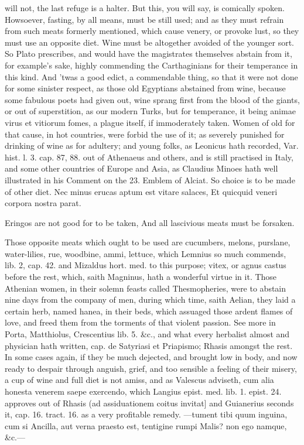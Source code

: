 {will not, the last refuge is a halter. But this, you will say, is
comically spoken. Howsoever, fasting, by all means, must be still used;
and as they must refrain from such meats formerly mentioned, which
cause venery, or provoke lust, so they must use an opposite diet.
Wine must be altogether avoided of the younger sort. So
Plato prescribes, and would have the magistrates themselves
abstain from it, for example's sake, highly commending the
Carthaginians for their temperance in this kind. And 'twas a good
edict, a commendable thing, so that it were not done for some sinister
respect, as those old Egyptians abstained from wine, because some
fabulous poets had given out, wine sprang first from the blood of the
giants, or out of superstition, as our modern Turks, but for
temperance, it being animae virus et vitiorum fomes, a plague itself,
if immoderately taken. Women of old for that cause, in hot
countries, were forbid the use of it; as severely punished for drinking
of wine as for adultery; and young folks, as Leonicus hath recorded,
Var. hist. l. 3. cap. 87, 88. out of Athenaeus and others, and is still
practised in Italy, and some other countries of Europe and Asia, as
Claudius Minoes hath well illustrated in his Comment on the 23. Emblem
of Alciat. So choice is to be made of other diet.
Nec minus erucas aptum est vitare salaces,
Et quicquid veneri corpora nostra parat.

Eringos are not good for to be taken,
And all lascivious meats must be forsaken.

Those opposite meats which ought to be used are cucumbers, melons,
purslane, water-lilies, rue, woodbine, ammi, lettuce, which Lemnius so
much commends, lib. 2, cap. 42. and Mizaldus hort. med. to this
purpose; vitex, or agnus castus before the rest, which, saith
Magninus, hath a wonderful virtue in it. Those Athenian women, in
their solemn feasts called Thesmopheries, were to abstain nine days
from the company of men, during which time, saith Aelian, they laid a
certain herb, named hanea, in their beds, which assuaged those ardent
flames of love, and freed them from the torments of that violent
passion. See more in Porta, Matthiolus, Crescentius lib. 5. \&c., and
what every herbalist almost and physician hath written, cap. de
Satyriasi et Priapismo; Rhasis amongst the rest. In some cases again,
if they be much dejected, and brought low in body, and now ready to
despair through anguish, grief, and too sensible a feeling of their
misery, a cup of wine and full diet is not amiss, and as Valescus
adviseth, cum alia honesta venerem saepe exercendo, which Langius
epist. med. lib. 1. epist. 24. approves out of Rhasis (ad assiduationem
coitus invitat] and Guianerius seconds it, cap. 16. tract. 16. as a
 very profitable remedy.
---tument tibi quum inguina, cum si
Ancilla, aut verna praesto est, tentigine rumpi
Malis? non ego namque, \&c.---

}
